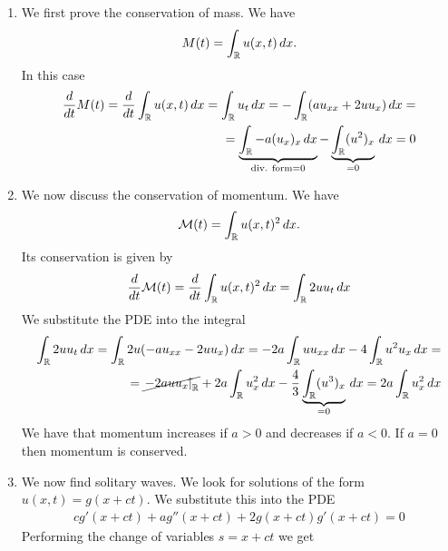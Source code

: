 \begin{enumerate}
    \item We first prove the conservation of mass. We have
          \[
              M(t) = \int_{\mathbb{R}} u(x, t) \, dx.
          \]
          In this case
          \[
              \begin{split}
                  \frac{d}{dt} M(t) = \frac{d}{dt} \int_{\mathbb{R}} u(x, t) \, dx = \int_{\mathbb{R}} u_t \, dx = -\int_{\mathbb{R}} (a u_{xx} + 2 u u_x) \, dx = \\
                  = \underbrace{\int_{\mathbb{R}} -a(u_x)_x \, dx}_{\text{div. form} = 0} - \underbrace{\int_{\mathbb{R}} (u^2)_x}_{=0} \, dx = 0
              \end{split}
          \]
    \item We now discuss the conservation of momentum. We have
          \[
              \begin{split}
                  \mathcal{M}(t) = \int_{\mathbb{R}} u(x, t) ^2 \, dx.
              \end{split}
          \]
          Its conservation is given by
          \[
              \begin{split}
                  \frac{d}{dt} \mathcal{M}(t) = \frac{d}{dt} \int_{\mathbb{R}} u(x, t)^2 \, dx = \int_{\mathbb{R}} 2 u u_t \, dx
              \end{split}
          \]
          We substitute the PDE into the integral
          \[
              \begin{split}
                  \int_{\mathbb{R}} 2 u u_t \, dx = \int_{\mathbb{R}} 2 u (-a u_{xx} - 2 u u_x) \, dx = -2a \int_{\mathbb{R}} u u_{xx} \, dx - 4 \int_{\mathbb{R}} u^2 u_x \, dx = \\
                  = \cancel{\left. -2a u u_x \right|_{\mathbb{R}}} + 2a \int_{\mathbb{R}} u_x^2 \, dx - \frac{4}{3} \underbrace{\int_{\mathbb{R}} (u^3)_x }_{=0} \, dx = 2a \int_{\mathbb{R}} u_x^2 \, dx
              \end{split}
          \]
          We have that momentum increases if \(a > 0\) and decreases if \(a < 0\). If \(a
          = 0\) then momentum is conserved.
    \item We now find solitary waves. We look for solutions of the form \(u(x, t) = g(x +
          ct)\). We substitute this into the PDE
          \[
              \begin{split}
                  cg'(x + ct) + a g''(x + ct) + 2 g(x + ct) g'(x + ct) = 0
              \end{split}
          \]
          Performing the change of variables \(s = x + ct\) we get
          \[
              \begin{split}

\end{split}\]
\end{enumerate}
